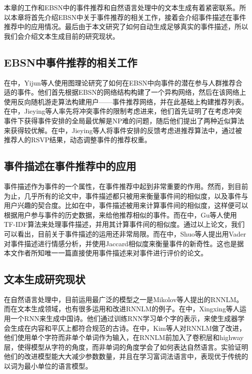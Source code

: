 % 
本章的工作和EBSN中的事件推荐和自然语言处理中的文本生成有着紧密联系。所以本章将首先介绍EBSN中关于事件推荐的相关工作，接着会介绍事件描述在事件推荐中的应用情况。最后由于本文研究了如何自动生成足够真实的事件描述，所以我们会介绍文本生成目前的研究现状。
\subsection{EBSN中事件推荐的相关工作}
在\cite{EBSN_event_reco}中，Yijun等人使用图理论研究了如何在EBSN中向事件的潜在参与人群推荐合适的事件。他们首先根据EBSN的网络结构构建了一个异构网络，然后在该网络上使用反向随机游走算法构建用户——事件推荐网络，并在此基础上构建推荐列表。在\cite{EBSN_conflict-aware_2016}中，Jieying等人率先将冲突事件的限制考虑进来，他们首先证明了在考虑冲突事件下获得事件安排的全局最优解是NP难的问题，随后他们提出了两种近似算法来获得较优解。在\cite{EBSN_feedback-aware_2017}中，Jieying等人将事件安排的反馈考虑进推荐算法中，通过被推荐人的RSVP结果，动态调整事件的推荐权重。

\subsection{事件描述在事件推荐中的应用}
事件描述作为事件的一个属性，在事件推荐中起到非常重要的作用。然而，到目前为止，几乎所有的论文中，事件描述都只被用来衡量事件间的相似度，以及事件与用户兴趣的契合度。比如在\cite{EBSN_who_will}中，事件描述被用来计算事件间的相似度，这样便可以根据用户参与事件的历史数据，来给他推荐相似的事件。而在\cite{gu_context_2016}中，Gu等人使用TF-IDF算法来处理事件描述，并用其计算事件间的相似度。通过以上论文，我们可以看出，目前关于事件描述的运用还非常局限。而在\cite{event_organization_101}中，Shuo等人提出用Vader对事件描述进行情感分析，并使用Jaccard相似度来衡量事件的新奇性。这也是据本文作者所知唯一一篇直接使用事件描述来对事件进行评价的论文。

\subsection{文本生成研究现状}
在自然语言处理中，目前运用最广泛的模型之一是Mikolov等人提出的RNNLM\cite{mikolov_rnnlm_2011}。而在文本生成领域，也有很多运用和改进RNNLM的例子。在\cite{Chinese_Poetry}中，Xingxing等人运用一个RNN来生成中国诗。他们通过训练RNN学习单个字的表示，来使生成器学会生成在内容和平仄上都符合规范的古诗。在\cite{kim_character-aware_2015}中，Kim等人对RNNLM做了改进，他们使用单个字符而非单个单词作为输入，在RNNLM前加入了卷积层和highway层，使得模型从字符的角度，而非单词的角度学会了如何表达自然语言。实验证明他们的改进模型能大大减少参数数量，并且在学习富词法语言中，表现优于传统的以词为最小单位的语言模型。

